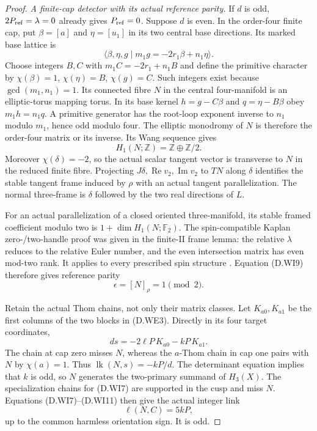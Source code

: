 \begin{proof}
\emph{A finite-cap detector with its actual reference parity.}
If $d$ is odd, $2P_{\rm ref}=\lambda=0$ already gives
$P_{\rm ref}=0$.  Suppose $d$ is even.  In the order-four
finite cap, put $\beta=[a]$ and $\eta=[u_1]$ in its two
central base directions.  Its marked base lattice is
\[
 \langle\beta,\eta,g\mid m_1g=-2r_1\beta+n_1\eta\rangle .
 \tag{D.WI8}
\]
Choose integers $B,C$ with $m_1C=-2r_1+n_1B$ and define the
primitive character by $\chi(\beta)=1$, $\chi(\eta)=B$,
$\chi(g)=C$.  Such integers exist because $\gcd(m_1,n_1)=1$.
Its connected fibre $N$ in the central four-manifold is an
elliptic-torus mapping torus.  In its base kernel
$h=g-C\beta$ and $q=\eta-B\beta$ obey $m_1h=n_1q$.
A primitive generator has the root-loop exponent inverse to
$n_1$ modulo $m_1$, hence odd modulo four.  The elliptic
monodromy of $N$ is therefore the order-four matrix or its
inverse.  Its Wang sequence gives
\[
             H_1(N;\mathbb Z)=\mathbb Z\oplus\mathbb Z/2.
 \tag{D.WI9}
\]
Moreover $\chi(\delta)=-2$, so the actual scalar tangent
vector is transverse to $N$ in the reduced finite fibre.
Projecting $J\delta,\operatorname{Re}v_2,\operatorname{Im}v_2$
to $TN$ along $\delta$ identifies the stable tangent frame
induced by $\rho$ with an actual tangent parallelization.
The normal three-frame is $\delta$ followed by the two real
directions of $L$.

For an actual parallelization of a closed oriented
three-manifold, its stable framed coefficient modulo two is
$1+\dim H_1(N;\mathbb F_2)$.  The spin-compatible Kaplan
zero-/two-handle proof was given in the finite-II frame lemma:
the relative $\lambda$ reduces to the relative Euler number,
and the even intersection matrix has even mod-two rank.
It applies to every prescribed spin structure
\cite[Definition 1.7 and Theorem 3.1, pp.239,243--246]{mapsKaplan79}.
Equation (D.WI9) therefore gives reference parity
\[
                         \epsilon=[N]_\rho=1\pmod2 .
 \tag{D.WI10}
\]

Retain the actual Thom chains, not only their matrix classes.
Let $K_{a0},K_{a1}$ be the first columns of the two blocks in
(D.WE3).  Directly in its four target coordinates,
\[
                    d s=-2\ell P\,K_{a0}-kP\,K_{a1}.
 \tag{D.WI11}
\]
The chain at cap zero misses $N$, whereas the $a$-Thom
chain in cap one pairs with $N$ by $\chi(a)=1$.
Thus $\operatorname{lk}(N,s)=-kP/d$.
The determinant equation implies that $k$ is odd, so $N$
generates the two-primary summand of $H_3(X)$.
The specialization chains for (D.WI7) are supported in the
cusp and miss $N$.  Equations (D.WI7)--(D.WI11) then give
the actual integer link
\[
                          \ell(N,C)=5kP,
 \tag{D.WI12}
\]
up to the common harmless orientation sign.  It is odd.


\end{proof}
